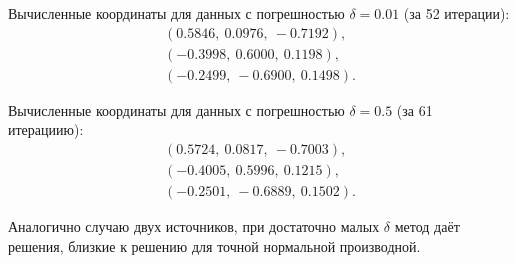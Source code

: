 Вычисленные координаты для данных с погрешностью $\delta=0.01$ (за 52 итерации):
\begin{align}
    (0.5846,\ 0.0976,\ -0.7192) \text{,}\nonumber\\
    (-0.3998,\ 0.6000,\ 0.1198) \text{,}\nonumber\\
    (-0.2499,\ -0.6900,\ 0.1498) \text{.}\nonumber
\end{align}

Вычисленные координаты для данных с погрешностью $\delta=0.5$ (за 61 итерациию):
\begin{align}
    (0.5724,\ 0.0817,\ -0.7003) \text{,}\nonumber\\
    (-0.4005,\ 0.5996,\ 0.1215) \text{,}\nonumber\\
    (-0.2501,\ -0.6889,\ 0.1502) \text{.}\nonumber
\end{align}

Аналогично случаю двух источников, при достаточно малых $\delta$ метод даёт решения, близкие к решению для точной нормальной производной.
